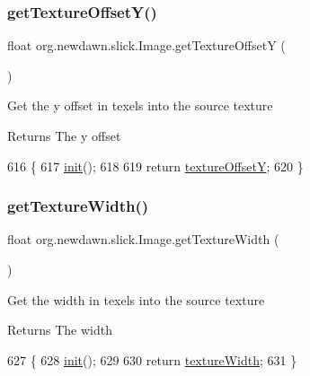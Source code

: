 \subsubsection{\texorpdfstring{get\+Texture\+Offset\+Y()}{getTextureOffsetY()}}
{\footnotesize\ttfamily float org.\+newdawn.\+slick.\+Image.\+get\+Texture\+OffsetY (\begin{DoxyParamCaption}{ }\end{DoxyParamCaption})\hspace{0.3cm}{\ttfamily [inline]}}

Get the y offset in texels into the source texture

\begin{DoxyReturn}{Returns}
The y offset 
\end{DoxyReturn}

\begin{DoxyCode}
616                                      \{
617         \mbox{\hyperlink{classorg_1_1newdawn_1_1slick_1_1_image_a94d180c9218ba1444a0496a1898ec345}{init}}();
618         
619         \textcolor{keywordflow}{return} \mbox{\hyperlink{classorg_1_1newdawn_1_1slick_1_1_image_a5c542a6d5fccbb7d56d74129b05cb78d}{textureOffsetY}};
620     \}
\end{DoxyCode}
\mbox{\label{classorg_1_1newdawn_1_1slick_1_1_image_a29fd0a5da72ff96d12bda50d9394f96c}} 
\subsubsection{\texorpdfstring{get\+Texture\+Width()}{getTextureWidth()}}
{\footnotesize\ttfamily float org.\+newdawn.\+slick.\+Image.\+get\+Texture\+Width (\begin{DoxyParamCaption}{ }\end{DoxyParamCaption})\hspace{0.3cm}{\ttfamily [inline]}}

Get the width in texels into the source texture

\begin{DoxyReturn}{Returns}
The width 
\end{DoxyReturn}

\begin{DoxyCode}
627                                    \{
628         \mbox{\hyperlink{classorg_1_1newdawn_1_1slick_1_1_image_a94d180c9218ba1444a0496a1898ec345}{init}}();
629         
630         \textcolor{keywordflow}{return} \mbox{\hyperlink{classorg_1_1newdawn_1_1slick_1_1_image_a0beda6fc601023aff97cce0d20d81f1e}{textureWidth}};
631     \}
\end{DoxyCode}
\mbox{\label{classorg_1_1newdawn_1_1slick_1_1_image_a94a5d32276e8a27930480223c5d69e11}} 
